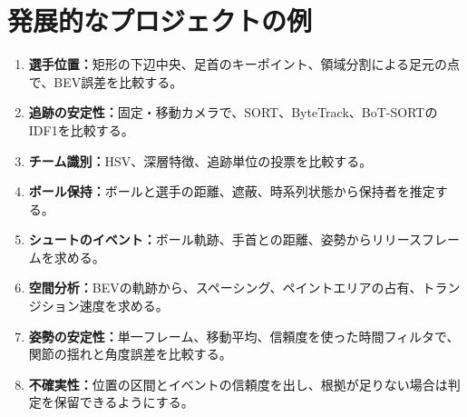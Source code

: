 \documentclass[11pt,a4paper,oneside]{report}
\begin{document}
\chapter{発展的なプロジェクトの例}

\begin{enumerate}
  \item \textbf{選手位置：}矩形の下辺中央、足首のキーポイント、領域分割による足元の点で、BEV誤差を比較する。
  \item \textbf{追跡の安定性：}固定・移動カメラで、SORT、ByteTrack、BoT-SORTのIDF1を比較する。
  \item \textbf{チーム識別：}HSV、深層特徴、追跡単位の投票を比較する。
  \item \textbf{ボール保持：}ボールと選手の距離、遮蔽、時系列状態から保持者を推定する。
  \item \textbf{シュートのイベント：}ボール軌跡、手首との距離、姿勢からリリースフレームを求める。
  \item \textbf{空間分析：}BEVの軌跡から、スペーシング、ペイントエリアの占有、トランジション速度を求める。
  \item \textbf{姿勢の安定性：}単一フレーム、移動平均、信頼度を使った時間フィルタで、関節の揺れと角度誤差を比較する。
  \item \textbf{不確実性：}位置の区間とイベントの信頼度を出し、根拠が足りない場合は判定を保留できるようにする。
\end{enumerate}
\end{document}
